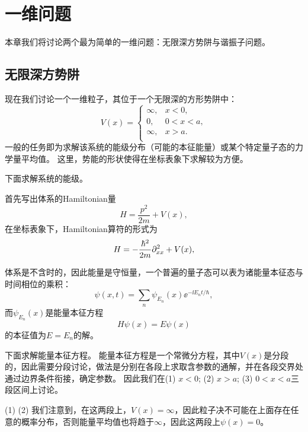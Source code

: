 \section{一维问题}
\label{sec:one_dim}

本章我们将讨论两个最为简单的一维问题：无限深方势阱与谐振子问题。

\subsection{无限深方势阱}
\label{subsec:onedim_inf_square}

现在我们讨论一个一维粒子，其位于一个无限深的方形势阱中：
\begin{equation}
    V(x) =
    \begin{cases}
        \infty, & x<0,  \\
        0,      & 0<x<a,\\
        \infty, & x>a.  \\
    \end{cases}
\end{equation}
一般的任务即为求解该系统的能级分布（可能的本征能量）或某个特定量子态的力学量平均值。
这里，势能的形状使得在坐标表象下求解较为方便。

下面求解系统的能级。

首先写出体系的Hamiltonian量
\begin{equation}
    H = \frac{p^2}{2m} + V(x),
\end{equation}
在坐标表象下，Hamiltonian算符的形式为
\begin{equation}
    H = -\frac{\hbar^2}{2m} \partial_{xx}^2 + V(x),
\end{equation}

体系是不含时的，因此能量是守恒量，一个普遍的量子态可以表为诸能量本征态与时间相位的乘积：
\begin{equation}
    \psi(x,t) = \sum_n \psi_{E_n}(x) \ee^{-\ii E_n t/\hbar},
\end{equation}
而$\psi_{E_n}(x)$是能量本征方程
\begin{equation}
    H\psi(x) = E \psi(x)
\end{equation}
的本征值为$E=E_n$的解。

下面求解能量本征方程。
能量本征方程是一个常微分方程，其中$V(x)$是分段的，因此需要分段讨论，做法是分别在各段上求取含参数的通解，并在各段交界处通过边界条件衔接，确定参数。
因此我们在(1) $x<0$; (2) $x>a$; (3) $0<x<a$三段区间上讨论。

(1) (2) 我们注意到，在这两段上，$V(x)=\infty$，因此粒子决不可能在上面存在任意的概率分布，否则能量平均值也将趋于$\infty$，因此这两段上$\psi(x)=0$。

